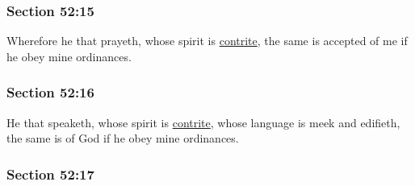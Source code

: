 
	\subsubsection{Section 52:15} %
		\label{DC52-15}

		Wherefore he that prayeth, whose spirit is \hyperref[CONTRITE]{contrite}, the same is accepted of me if he obey mine ordinances.


	\subsubsection{Section 52:16} %
		\label{DC52-16}

		He that speaketh, whose spirit is \hyperref[CONTRITE]{contrite}, whose language is meek and edifieth, the same is of God if he obey mine ordinances.


	\subsubsection{Section 52:17} %
		\label{DC52-17}

